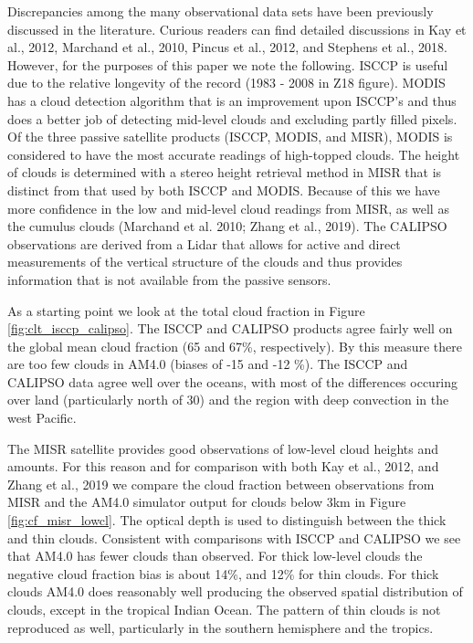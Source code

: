 \documentclass[draft]{agujournal2019}
\begin{document}
Discrepancies among the many observational data sets have been previously discussed in the literature.
Curious readers can find detailed discussions in Kay et al., 2012,
Marchand et al., 2010, Pincus et al., 2012, and Stephens et al., 2018.  However, for the 
purposes of this paper we note the following.  ISCCP is useful due to 
the relative longevity of the record (1983 - 2008 in Z18 figure). 
MODIS has a cloud detection algorithm that is an improvement upon ISCCP's and
thus does a better job of detecting mid-level clouds and excluding partly filled pixels.   
Of the three passive satellite products (ISCCP, MODIS, and MISR), MODIS is considered to have the most 
accurate readings of high-topped clouds.  The height of clouds is determined with a stereo height retrieval 
method in MISR that is distinct from that used by both ISCCP and MODIS.  Because of this we have more 
confidence in the low and mid-level cloud readings 
from MISR, as well as the cumulus clouds (Marchand et al. 2010; Zhang et al., 2019).   The CALIPSO observations
are derived from a Lidar that allows for active and direct measurements of the vertical structure of the clouds and thus 
provides information that is not available from the passive sensors.  

As a starting point we look at the total cloud fraction in Figure \ref{fig:clt_isccp_calipso}.  The ISCCP and 
CALIPSO products agree fairly well on the 
global mean cloud fraction (65 and 67\%, respectively).   By this measure there are too few clouds in AM4.0 
(biases of -15 and -12 \%).   The ISCCP and CALIPSO data agree well over the oceans, with most of the differences
occuring over land (particularly north of 30) and the region with deep convection in the west Pacific.    


The MISR satellite provides good observations of low-level cloud heights and amounts.  
For this reason and for comparison with both Kay et al., 2012, and Zhang et al., 2019 we compare the cloud fraction 
between observations from MISR and the AM4.0 simulator output for clouds below 3km in Figure \ref{fig:cf_misr_lowcl}.  
The optical depth is used to distinguish between the thick and thin clouds.  
Consistent with comparisons with ISCCP and CALIPSO we see that AM4.0 has fewer clouds than observed.
For thick low-level clouds the negative cloud fraction bias is about 14\%, and 12\% for thin clouds.   
For thick clouds AM4.0 does reasonably well producing the observed spatial distribution of clouds, except in the tropical Indian Ocean. 
The pattern of thin clouds is not reproduced as well, particularly in the southern hemisphere and the tropics.   
\end{document}
